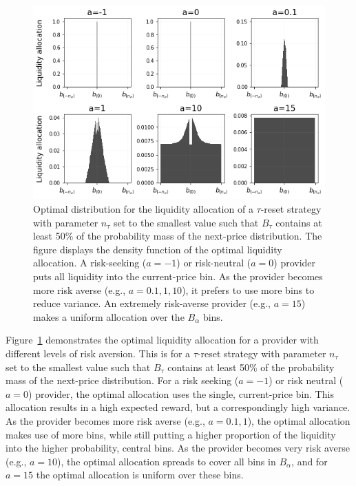 \documentclass[sigconf, usenames, dvipsnames]{acmart}
\begin{document}
\begin{figure}
    \centering
    \includegraphics[width=\linewidth]{img/optimal_allocs.png}
    \caption{Optimal distribution for the liquidity allocation of a $\tau$-reset strategy with parameter $n_{\tau}$ set to the smallest value such that $B_\tau$ contains at least 50\% of the probability mass of the next-price distribution. The figure displays the density function of the optimal liquidity allocation. A risk-seeking ($a=-1$) or risk-neutral ($a=0$) provider puts all liquidity into the current-price bin. As the provider becomes more risk averse (e.g., $a=0.1,1,10$), it prefers to use more bins to reduce variance. An  extremely risk-averse provider (e.g., $a=15$) makes a uniform allocation over the $B_\alpha$ bins.
    \label{fig:optimal_allocs}}
\end{figure}


Figure~\ref{fig:optimal_allocs} demonstrates the optimal liquidity allocation for a provider with different levels of risk aversion. This is for a $\tau$-reset strategy with parameter $n_{\tau}$ set to the smallest value such that $B_\tau$ contains at least 50\% of the probability mass of the next-price distribution. For a risk seeking ($a=-1$) or risk neutral ($a=0$) provider, the optimal allocation uses the single, current-price bin. This allocation results in a high expected reward, but a correspondingly high variance. As the provider becomes more risk averse (e.g., $a=0.1,1$), the optimal allocation makes use of more  bins, while still putting a higher proportion of the liquidity into the higher probability, central bins. As the provider becomes very risk averse (e.g., $a=10$), the optimal allocation spreads to cover all bins in $B_{\alpha}$, and for $a=15$ the optimal allocation is  uniform over these bins. 
\end{document}
